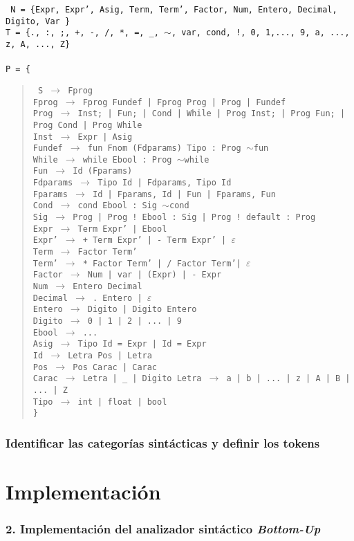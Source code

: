 \documentclass[12pt]{article}
\begin{document}
\noindent
\noindent
\texttt{
  \noindent
N = \{Expr, Expr', Asig, Term, Term', Factor, Num, Entero, Decimal, Digito, Var \}\\
T = \{., :, ;, +, -, /, *, =, \_, $\sim$, var, cond, !, 0, 1,..., 9, a, ..., z, A, ..., Z\}\\ \\ 
P = \{}
\begin{quote}
  \texttt{
    S $\to$ Fprog\\
    Fprog $\to$ Fprog Fundef | Fprog Prog | Prog | Fundef\\
    Prog $\to$ Inst; | Fun; | Cond | While | Prog Inst; | Prog Fun; | Prog Cond | Prog While\\
    Inst $\to$ Expr | Asig\\
    Fundef $\to$ fun Fnom (Fdparams) Tipo : Prog $\sim$fun\\
    While $\to$ while Ebool : Prog $\sim$while\\    
    Fun $\to$ Id (Fparams)\\
    Fdparams $\to$ Tipo Id | Fdparams, Tipo Id\\
    Fparams $\to$ Id | Fparams, Id | Fun | Fparams, Fun\\
    Cond $\to$ cond Ebool : Sig $\sim$cond \\
    Sig $\to$ Prog | Prog ! Ebool : Sig | Prog ! default : Prog \\
    Expr  $\to$ Term Expr' | Ebool \\
    Expr' $\to$ + Term Expr' | - Term Expr' | $\varepsilon$ \\
    Term  $\to$ Factor Term' \\
    Term' $\to$ * Factor Term' | / Factor Term'| $\varepsilon$ \\
    Factor $\to$ Num | var | (Expr) | - Expr \\
    Num $\to$ Entero Decimal \\
    Decimal $\to$ . Entero | $\varepsilon$ \\
    Entero $\to$ Digito | Digito Entero \\
    Digito $\to$ 0 | 1 | 2 | ... | 9 \\
    Ebool $\to$ ... \\
    Asig $\to$ Tipo Id = Expr | Id = Expr \\
    Id  $\to$ Letra Pos | Letra \\
    Pos  $\to$ Pos Carac | Carac \\
    Carac $\to$ Letra | \_ | Digito
    Letra $\to$ a | b | ... | z | A | B | ... | Z \\
    Tipo $\to$ int | float | bool \\
    \}
}
 
\end{quote}

\subsubsection*{Identificar las categorías sintácticas y definir los tokens}

\section{Implementación}
\subsubsection*{2. Implementación del analizador sintáctico \textit{Bottom-Up}}
\end{document}
